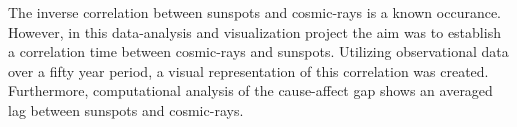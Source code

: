 \vspace{0.5cm}
\hspace{0.6cm}The inverse correlation between sunspots and cosmic-rays is a known occurance.
However,
in this data-analysis and visualization project the aim was to establish a 
correlation time between cosmic-rays and sunspots. Utilizing observational
data over a fifty year period, a visual representation of this correlation
was created. Furthermore, computational analysis of the cause-affect gap
shows an averaged lag between sunspots and cosmic-rays.
